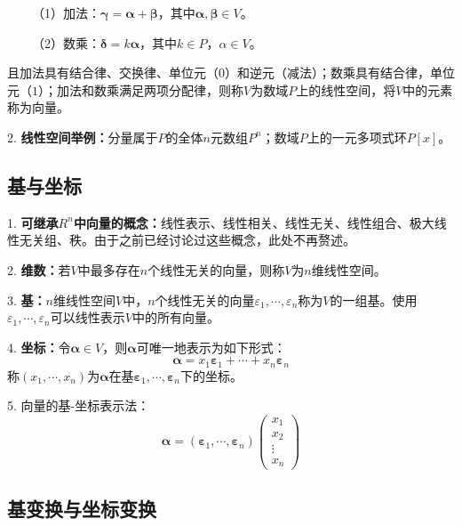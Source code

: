 ~~~~（1）加法：$\boldsymbol{\gamma}=\boldsymbol{\alpha}+\boldsymbol{\beta}$，其中$\boldsymbol{\alpha},\boldsymbol{\beta}\in V$。

~~~~（2）数乘：$\boldsymbol{\delta}=k\boldsymbol{\alpha}$，其中$k\in P$，$\alpha\in V$。

且加法具有结合律、交换律、单位元（$0$）和逆元（减法）；数乘具有结合律，单位元（$1$）；加法和数乘满足两项分配律，则称$V$为数域$P$上的线性空间，将$V$中的元素称为向量。

2. \textbf{线性空间举例：}分量属于$P$的全体$n$元数组$P^n$；数域$P$上的一元多项式环$P[x]$。

\subsection{基与坐标}

1. \textbf{可继承$R^n$中向量的概念：}线性表示、线性相关、线性无关、线性组合、极大线性无关组、秩。由于之前已经讨论过这些概念，此处不再赘述。

2. \textbf{维数：}若$V$中最多存在$n$个线性无关的向量，则称$V$为$n$维线性空间。

3. \textbf{基：}$n$维线性空间$V$中，$n$个线性无关的向量$\varepsilon_1,\cdots,\varepsilon_n$称为$V$的一组基。使用$\varepsilon_1,\cdots,\varepsilon_n$可以线性表示$V$中的所有向量。

4. \textbf{坐标：}令$\boldsymbol{\alpha}\in V$，则$\boldsymbol{\alpha}$可唯一地表示为如下形式：
\begin{equation*}
    \boldsymbol{\alpha}=x_1\boldsymbol{\varepsilon}_1+\cdots+x_n\boldsymbol{\varepsilon}_n
\end{equation*}
称$(x_1,\cdots,x_n)$为$\boldsymbol{\alpha}$在基$\boldsymbol{\varepsilon}_1,\cdots,\boldsymbol{\varepsilon}_n$下的坐标。

5. 向量的基-坐标表示法：
\begin{equation*}
    \boldsymbol{\alpha}=(\boldsymbol{\varepsilon}_1,\cdots,\boldsymbol{\varepsilon}_n)\begin{pmatrix}
        x_1\\
        x_2\\
        \vdots\\
        x_n
    \end{pmatrix}
\end{equation*}

\subsection{基变换与坐标变换}

